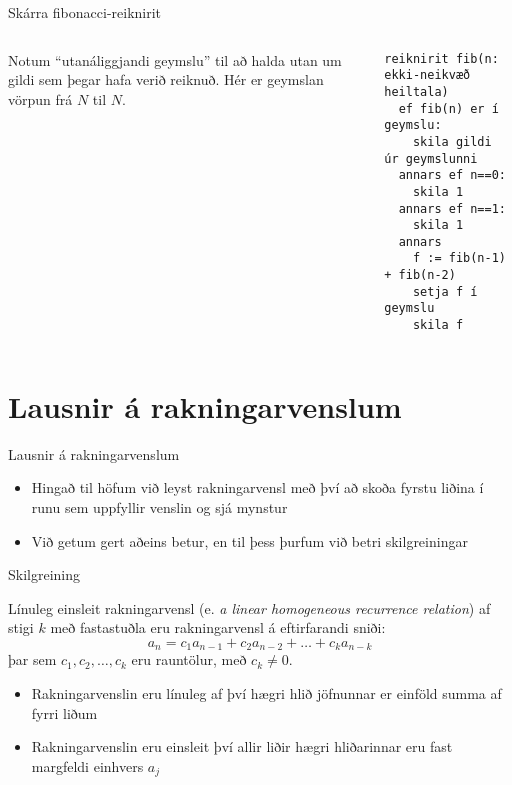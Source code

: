\documentclass[handout]{beamer}
\begin{document}
\begin{frame}[fragile]{Skárra fibonacci-reiknirit}
\begin{columns}
Notum ``utanáliggjandi geymslu'' til að halda utan um gildi sem þegar hafa verið reiknuð. Hér er geymslan vörpun frá $N$ til $N$.
\begin{verbatim}
reiknirit fib(n: ekki-neikvæð heiltala)
  ef fib(n) er í geymslu:
    skila gildi úr geymslunni
  annars ef n==0:
    skila 1
  annars ef n==1:
    skila 1
  annars
    f := fib(n-1) + fib(n-2)
    setja f í geymslu
    skila f
\end{verbatim}
\end{columns}
\end{frame}

\section{Lausnir á rakningarvenslum}

\begin{frame}{Lausnir á rakningarvenslum}
\begin{itemize}
 \item Hingað til höfum við leyst rakningarvensl með því að skoða fyrstu liðina í runu sem uppfyllir venslin og sjá mynstur
 \item Við getum gert aðeins betur, en til þess þurfum við betri skilgreiningar
\end{itemize}
\end{frame}

\begin{frame}{Skilgreining}
\begin{tcolorbox}[title=Línuleg einsleit rakningarvensl með fastastuðlum]
Línuleg einsleit rakningarvensl (e. \emph{a linear homogeneous recurrence relation}) af stigi $k$ með fastastuðla eru rakningarvensl á eftirfarandi sniði:
\[
 a_n = c_1 a_{n-1} + c_2a_{n-2} + \ldots + c_ka_{n-k}
\]
þar sem $c_1, c_2, \ldots, c_k$ eru rauntölur, með $c_k \neq 0$.
\end{tcolorbox}
\begin{itemize}
 \item Rakningarvenslin eru línuleg af því hægri hlið jöfnunnar er einföld summa af fyrri liðum
 \item Rakningarvenslin eru einsleit því allir liðir hægri hliðarinnar eru fast margfeldi einhvers $a_j$
\end{itemize}
\end{frame}
\end{document}
